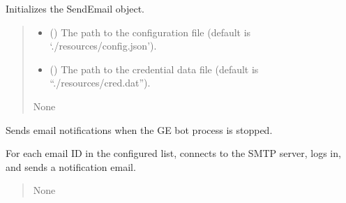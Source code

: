 \documentclass[letterpaper,10pt,english]{sphinxmanual}
\begin{document}
\begin{fulllineitems}
\label{\detokenize{index:notificationHandler.SendEmail.__init__}}
\pysigstartsignatures
{}
\pysigstopsignatures
\sphinxAtStartPar
Initializes the SendEmail object.
\begin{quote}\begin{description}
\begin{itemize}
\item {} 
\sphinxAtStartPar
{} (\sphinxstyleliteralemphasis{\sphinxupquote{, }}) \textendash{} The path to the configuration file (default is ‘./resources/config.json’).

\item {} 
\sphinxAtStartPar
{} (\sphinxstyleliteralemphasis{\sphinxupquote{, }}) \textendash{} The path to the credential data file (default is “./resources/cred.dat”).

\end{itemize}

\sphinxAtStartPar
None

\end{description}\end{quote}

\end{fulllineitems}


\begin{fulllineitems}
\label{\detokenize{index:notificationHandler.SendEmail.process_stopped}}
\pysigstartsignatures
{}
\pysigstopsignatures
\sphinxAtStartPar
Sends email notifications when the GE bot process is stopped.

\sphinxAtStartPar
For each email ID in the configured list, connects to the SMTP server, logs in, and sends a notification email.
\begin{quote}\begin{description}
\sphinxAtStartPar
{} \textendash{} 

\sphinxAtStartPar
None

\end{description}\end{quote}

\end{fulllineitems}
\end{document}
